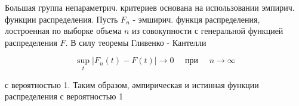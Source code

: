 \documentclass[10pt]{article}
\begin{document}
Большая группа непараметрич. критериев основана на использовании эмпирич. функции распределения. Пусть $F_{n}$ - эмширич. функця распределения, лостроенная по выборке объема $n$ из совокупности с генеральной функцией распределения $F$. В силу теоремы Гливенко - Кантелли



\[

\sup _{t}\left|F_{n}(t)-F(t)\right| \longrightarrow 0 \quad \text { при } \quad n \longrightarrow \infty

\]



с вероятностью 1. Таким образом, әмпирическая и истинная функции распределения с вероятностью 1
\end{document}
